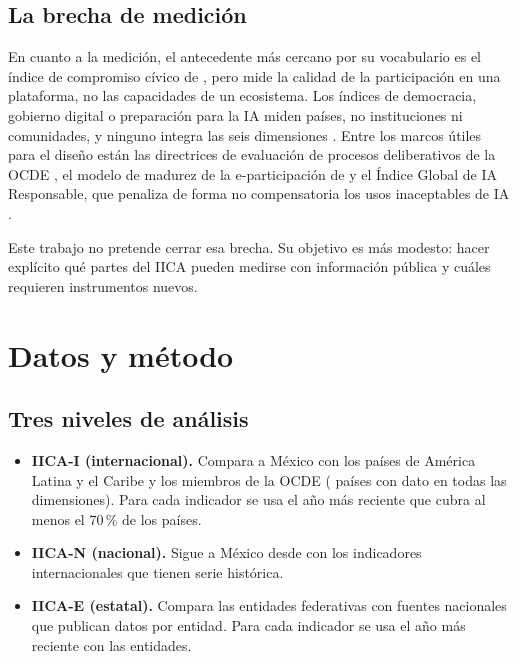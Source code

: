 \documentclass[11pt,a4paper]{article}
\begin{document}
\subsection{La brecha de medición}

En cuanto a la medición, el antecedente más cercano por su vocabulario es el índice de compromiso cívico de \textcite{nechesov_ruponen_2024}, pero mide la calidad de la participación en una plataforma, no las capacidades de un ecosistema. Los índices de democracia, gobierno digital o preparación para la IA miden países, no instituciones ni comunidades, y ninguno integra las seis dimensiones \parencite{informe_ica_2026}. Entre los marcos útiles para el diseño están las directrices de evaluación de procesos deliberativos de la OCDE \parencite{ocde_evaluacion_2021}, el modelo de madurez de la e-participación de \textcite{serdult_2023} y el Índice Global de IA Responsable, que penaliza de forma no compensatoria los usos inaceptables de IA \parencite{girai_metodo_2026}.

Este trabajo no pretende cerrar esa brecha. Su objetivo es más modesto: hacer explícito qué partes del IICA pueden medirse con información pública y cuáles requieren instrumentos nuevos.

\section{Datos y método}

\subsection{Tres niveles de análisis}

\begin{itemize}
  \item \textbf{IICA-I (internacional).} Compara a México con los países de América Latina y el Caribe y los miembros de la OCDE (\NPaises{} países con dato en todas las dimensiones). Para cada indicador se usa el año más reciente que cubra al menos el 70\,\% de los países.
  \item \textbf{IICA-N (nacional).} Sigue a México desde \NACdesde{} con los indicadores internacionales que tienen serie histórica.
  \item \textbf{IICA-E (estatal).} Compara las \NEnt{} entidades federativas con fuentes nacionales que publican datos por entidad. Para cada indicador se usa el año más reciente con las \NEnt{} entidades.
\end{itemize}
\end{document}
